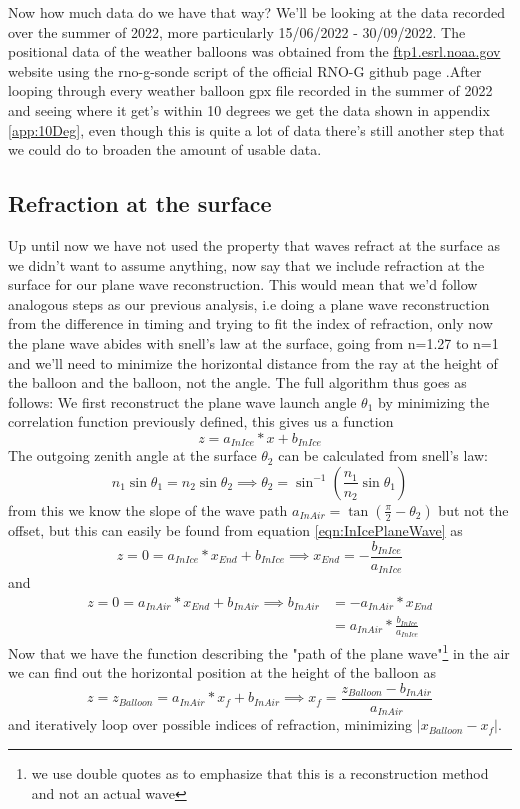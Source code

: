 \documentclass[11pt,a4paper,faculty=we,language=en,doctype=report]{cls/ugent-doc}
\begin{document}
Now how much data do we have that way? 
We'll be looking at the data recorded over the summer of
2022, more particularly 15/06/2022 - 30/09/2022.
The positional data of the weather balloons was obtained from the
\url{ftp1.esrl.noaa.gov} website using the rno-g-sonde script of the official
RNO-G github page .After looping through every weather
balloon gpx file recorded in the summer of 2022 and seeing where it get's
within 10 degrees we get the data shown in appendix \ref{app:10Deg}, even
though this is quite a lot of data there's still another step that we could do
to broaden the amount of usable data.
\subsection{Refraction at the surface}
Up until now we have not used the property that waves refract at the surface as
we didn't want to assume anything, now say that we include refraction at the
surface for our plane wave reconstruction. This would mean that we'd follow
analogous steps as our previous analysis, i.e doing a plane wave reconstruction
from the difference in timing and trying to fit the index of refraction, only
now the plane wave abides with snell's law at the surface, going from n=1.27 to
n=1 and we'll need to minimize the horizontal distance from the ray at the
height of the balloon and the balloon, not the angle.  
The full algorithm thus goes as follows: We first reconstruct the
plane wave launch angle $\theta_1$ by minimizing the correlation function
previously defined, this gives us a function
\begin{equation}
	z = a_{InIce}*x + b_{InIce}
	\label{eqn:InIcePlaneWave}
\end{equation}
The outgoing zenith angle at the surface $\theta_2$ can be calculated from snell's law:
\begin{equation}
n_1 \sin{\theta_1} = n_2 \sin{\theta_2} \implies  \theta_2 = \sin^{-1}\left(\frac{n_1}{n_2}\sin{\theta_1}\right)
\end{equation}
from this we know the slope of the wave path $a_{InAir} = \tan\left({\frac{\pi}{2} -
\theta_2}\right)$ but not the offset, but this can easily be found from equation
\ref{eqn:InIcePlaneWave} as 
\begin{equation}
	z = 0 = a_{InIce}*x_{End} + b_{InIce} \implies x_{End} = -\frac{b_{InIce}}{a_{InIce}}
\end{equation}
and 
\begin{align}
	z = 0 = a_{InAir}*x_{End} + b_{InAir} \implies b_{InAir} &= -a_{InAir}*x_{End}
	\\&= a_{InAir}* \frac{b_{InIce}}{a_{InIce}}
\end{align}
Now that we have the function describing the "path of the plane wave"\footnote{we use double
quotes as to emphasize that this is a reconstruction method and not an actual wave} in the air 
we can find out the horizontal position at the height of the balloon as
\begin{equation}
	z = z_{Balloon} = a_{InAir}*x_{f} + b_{InAir} \implies x_f = \frac{z_{Balloon} - b_{InAir}}{a_{InAir}}
\end{equation}
and iteratively loop over possible indices of refraction, minimizing $|x_{Balloon} - x_f|$.
\end{document}
